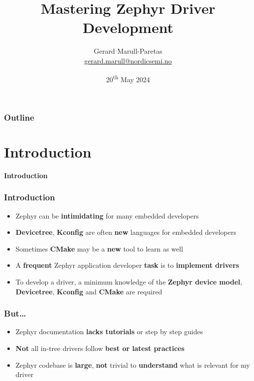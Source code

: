 \documentclass[handout]{beamer}
\title{Mastering Zephyr Driver\\Development}
\author{
  \texorpdfstring{
    Gerard Marull-Paretas\\
    \href{mailto:gerard.marull@nordicsemi.no}{gerard.marull@nordicsemi.no}
  }{Gerard Marull-Paretas}
}
\institute{Nordic Semiconductor ASA}
\date{20\textsuperscript{th} May 2024}
\begin{document}

\begin{frame}[plain]
  \titlepage{}
\end{frame}

\begin{frame}
  \frametitle{Outline}
  \tableofcontents
\end{frame}


\section{Introduction}

\begin{frame}
  \begin{center}
    \Huge \textbf{Introduction}
  \end{center}
\end{frame}

\begin{frame}
  \frametitle{Introduction}

  \begin{itemize}
    \item Zephyr can be \textbf{intimidating} for many embedded developers
    \item \textbf{Devicetree}, \textbf{Kconfig} are often \textbf{new}
          languages for embedded developers
    \item Sometimes \textbf{CMake} may be a \textbf{new} tool to learn as
          well
    \item A \textbf{frequent} Zephyr application developer \textbf{task} is to
          \textbf{implement drivers}
    \item To develop a driver, a minimum knowledge of the
          \textbf{Zephyr device model}, \textbf{Devicetree}, \textbf{Kconfig}
          and \textbf{CMake} are required
  \end{itemize}
\end{frame}

\begin{frame}
  \frametitle{But\ldots}

  \begin{itemize}
    \item Zephyr documentation \textbf{lacks tutorials} or step by step guides
    \item \textbf{Not} all in-tree drivers follow
          \textbf{best or latest practices}
    \item Zephyr codebase is \textbf{large}, \textbf{not} trivial to
          \textbf{understand} what is relevant for my driver
  \end{itemize}
\end{frame}
\end{document}
